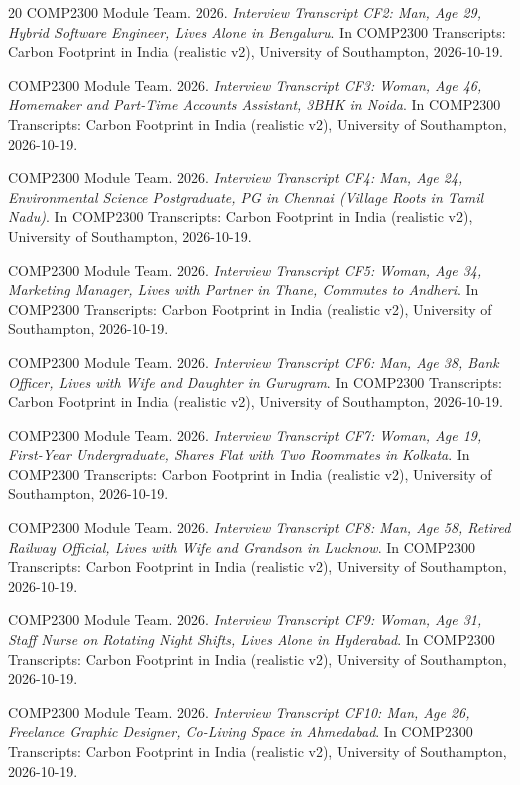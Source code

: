 \documentclass[12pt, a4paper]{article}
\begin{document}
\begin{thebibliography}{20}
COMP2300 Module Team. 2026. \textit{Interview Transcript CF2: Man, Age 29, Hybrid Software Engineer, Lives Alone in Bengaluru}. In COMP2300 Transcripts: Carbon Footprint in India (realistic v2), University of Southampton, 2026-10-19.

COMP2300 Module Team. 2026. \textit{Interview Transcript CF3: Woman, Age 46, Homemaker and Part-Time Accounts Assistant, 3BHK in Noida}. In COMP2300 Transcripts: Carbon Footprint in India (realistic v2), University of Southampton, 2026-10-19.

COMP2300 Module Team. 2026. \textit{Interview Transcript CF4: Man, Age 24, Environmental Science Postgraduate, PG in Chennai (Village Roots in Tamil Nadu)}. In COMP2300 Transcripts: Carbon Footprint in India (realistic v2), University of Southampton, 2026-10-19.

COMP2300 Module Team. 2026. \textit{Interview Transcript CF5: Woman, Age 34, Marketing Manager, Lives with Partner in Thane, Commutes to Andheri}. In COMP2300 Transcripts: Carbon Footprint in India (realistic v2), University of Southampton, 2026-10-19.

COMP2300 Module Team. 2026. \textit{Interview Transcript CF6: Man, Age 38, Bank Officer, Lives with Wife and Daughter in Gurugram}. In COMP2300 Transcripts: Carbon Footprint in India (realistic v2), University of Southampton, 2026-10-19.

COMP2300 Module Team. 2026. \textit{Interview Transcript CF7: Woman, Age 19, First-Year Undergraduate, Shares Flat with Two Roommates in Kolkata}. In COMP2300 Transcripts: Carbon Footprint in India (realistic v2), University of Southampton, 2026-10-19.

COMP2300 Module Team. 2026. \textit{Interview Transcript CF8: Man, Age 58, Retired Railway Official, Lives with Wife and Grandson in Lucknow}. In COMP2300 Transcripts: Carbon Footprint in India (realistic v2), University of Southampton, 2026-10-19.

COMP2300 Module Team. 2026. \textit{Interview Transcript CF9: Woman, Age 31, Staff Nurse on Rotating Night Shifts, Lives Alone in Hyderabad}. In COMP2300 Transcripts: Carbon Footprint in India (realistic v2), University of Southampton, 2026-10-19.

COMP2300 Module Team. 2026. \textit{Interview Transcript CF10: Man, Age 26, Freelance Graphic Designer, Co-Living Space in Ahmedabad}. In COMP2300 Transcripts: Carbon Footprint in India (realistic v2), University of Southampton, 2026-10-19.

\end{thebibliography}
\end{document}
